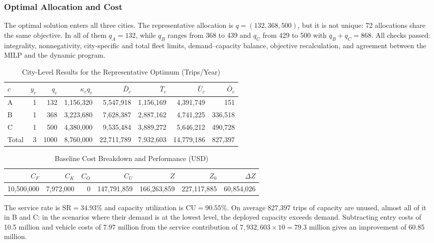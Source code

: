 \documentclass[10pt,a4paper]{article}
\begin{document}
\subsubsection{Optimal Allocation and Cost}
The optimal solution enters all three cities. The representative allocation is $q=(132,368,500)$, but it is not unique: 72 allocations share the same objective. In all of them $q_A=132$, while $q_B$ ranges from 368 to 439 and $q_C$ from 429 to 500 with $q_B+q_C=868$.
All checks passed: integrality, nonnegativity, city-specific and total fleet limits, demand--capacity balance, objective recalculation, and agreement between the MILP and the dynamic program.
\begin{table}[H]
\centering\small
\caption{City-Level Results for the Representative Optimum (Trips/Year)}\label{tab:an-base-city}
\begin{tabular}{lrrrrrrr}
\toprule
$c$ & $y_c$ & $q_c$ & $\kappa_cq_c$ & $\bar D_c$ & $\bar T_c$ & $\bar U_c$ & $\bar O_c$\\\midrule
A & 1 & 132 & 1,156,320 & 5,547,918 & 1,156,169 & 4,391,749 & 151\\
B & 1 & 368 & 3,223,680 & 7,628,387 & 2,887,162 & 4,741,225 & 336,518\\
C & 1 & 500 & 4,380,000 & 9,535,484 & 3,889,272 & 5,646,212 & 490,728\\
Total & 3 & 1000 & 8,760,000 & 22,711,789 & 7,932,603 & 14,779,186 & 827,397\\
\bottomrule
\end{tabular}
\end{table}
\begin{table}[H]
\centering\small
\caption{Baseline Cost Breakdown and Performance (USD)}\label{tab:an-base-cost}
\begin{tabular}{rrrrrrr}
\toprule
$C_F$ & $C_K$ & $C_O$ & $C_U$ & $Z$ & $Z_0$ & $\Delta Z$\\\midrule
10,500,000 & 7,972,000 & 0 & 147,791,859 & 166,263,859 & 227,117,885 & 60,854,026\\
\bottomrule
\end{tabular}
\end{table}
The service rate is $\mathrm{SR}=34.93\%$ and capacity utilization is $\mathrm{CU}=90.55\%$.
On average 827{,}397 trips of capacity are unused, almost all of it in B and C: in the scenarios where their demand is at the lowest level, the deployed capacity exceeds demand. Subtracting entry costs of 10.5 million and vehicle costs of 7.97 million from the service contribution of $7{,}932{,}603\times10=79.3$ million gives an improvement of 60.85 million.
\end{document}
